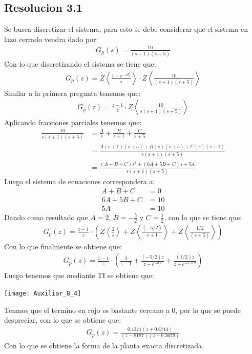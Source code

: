 \documentclass[
  11pt,
  letterpaper,
   addpoints,
  ]{exam}
\begin{document}
\begin{questions}
\begin{solution}
\subsection*{Resolucion 3.1}
Se busca discretizar el sistema, para esto se debe considerar que el sistema en lazo cerrado vendra dado por:
\begin{align}
    G_{p}(s) = \frac{10}{(s+1)(s+5)}
\end{align}
Con lo que discretizando el sistema se tiene que:
\begin{align}
    G_{p}(z) = Z\left< \frac{1-e^{-sT_{s}}}{s}\right> \cdot Z\left< \frac{10}{(s+1)(s+5)}\right>
\end{align}
Similar a la primera pregunta tenemos que:
\begin{align}
    G_{p}(z) = \frac{z-1}{z}\cdot Z\left< \frac{10}{s(s+1)(s+5)}\right>
\end{align}
Aplicando fracciones parciales tenemos que:
\begin{align}
    \frac{10}{s(s+1)(s+5)} &= \frac{A}{s} + \frac{B}{s+1} + \frac{C}{s+5}\\
    &= \frac{A(s+1)(s+5) + B(s)(s+5) + C(s)(s+1)}{s(s+1)(s+5)}\\
    &= \frac{(A+B+C)s^{2} + (6A + 5B + C)s + 5A}{s(s+1)(s+5)}
\end{align}
Luego el sistema de ecuaciones correspondera a:
\begin{align}
    A+B+C &= 0\\
    6A + 5B + C &= 10\\
    5A &= 10
\end{align}
Dando como resultado que $A=2$, $B=-\frac{5}{2}$ y $C=\frac{1}{2}$, con lo que se tiene que:
\begin{align}
    G_{p}(z) = \frac{z-1}{z}\cdot \left( Z\left< \frac{2}{s} \right> + Z\left< \frac{(-5/2)}{s+1}\right> + Z\left< \frac{1/2}{(s+5)} \right>  \right)
\end{align}
Con lo que finalmente se obtiene que:
\begin{align}
    G_{p}(z) = \frac{z-1}{z} \cdot \left( \frac{2}{z-1} + \frac{(-5/2)z}{z-e^{-0.2}} + \frac{(1/2)z}{z-e^{-5\cdot 0.2}}\right)
\end{align}
Luego tenemos que mediante TI se obtiene que:
\begin{center}
    \texttt{[image: Auxiliar\_8\_4]}
\end{center}
Tenmos que el termino en rojo es bastante cercano a 0, por lo que se puede despreciar, con lo que se obtiene que:
\begin{align}
    G_{p}(z)= \frac{0.1371 (z+0.6714)}{(z-8187)(z-0.3679)}
\end{align}
Con lo que se obtiene la forma de la planta exacta discretizada.

\end{solution}
\end{questions}
\end{document}
